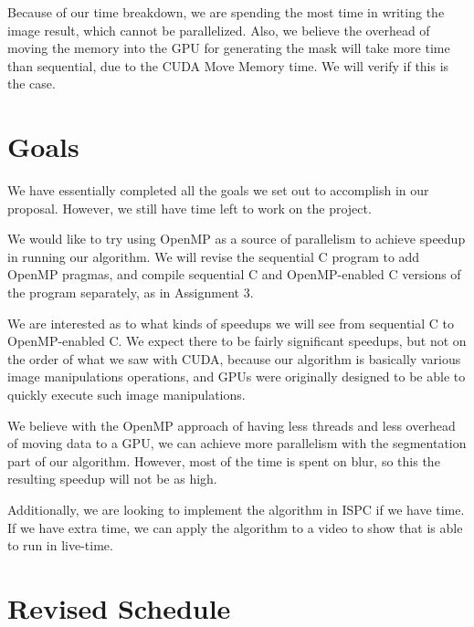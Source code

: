 \documentclass[12pt]{article}
\begin{document}
Because of our time breakdown, we are spending the most time in writing the
image result, which cannot be parallelized. Also, we believe the overhead of
moving the memory into the GPU for generating the mask will take more time than
sequential, due to the CUDA Move Memory time. We will verify if this is the
case.

\section{Goals}

We have essentially completed all the goals we set out to accomplish in our
proposal. However, we still have time left to work on the project.

We would like to try using OpenMP as a source of parallelism to achieve speedup
in running our algorithm. We will revise the sequential C program to add OpenMP
pragmas, and compile sequential C and OpenMP-enabled C versions of the program
separately, as in Assignment 3.

We are interested as to what kinds of speedups we will see from sequential C to
OpenMP-enabled C. We expect there to be fairly significant speedups, but not on
the order of what we saw with CUDA, because our algorithm is basically various
image manipulations operations, and GPUs were originally designed to be able to
quickly execute such image manipulations.

We believe with the OpenMP approach of having less threads and less overhead of
moving data to a GPU, we can achieve more parallelism with the segmentation
part of our algorithm. However, most of the time is spent on blur, so this the
resulting speedup will not be as high.

Additionally, we are looking to implement the algorithm in ISPC if we have
time. If we have extra time, we can apply the algorithm to a video to show that
is able to run in live-time.

\section{Revised Schedule}
\end{document}
